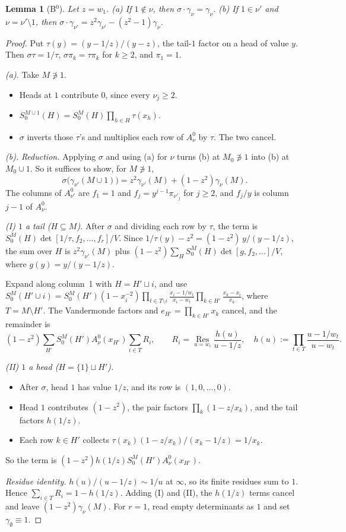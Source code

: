 \documentclass[11pt]{article}
\newtheorem{lemma}[theorem]{Lemma}
\theoremstyle{remark}
\begin{document}
\begin{lemma}[B$^0$]
Let $z=w_1$. (a) If $1\notin\nu$, then $\sigma\cdot\gamma_\nu=\gamma_\nu$.
(b) If $1\in\nu'$ and $\nu=\nu'\setminus1$, then $\sigma\cdot\gamma_{\nu'}=z^2\gamma_{\nu'}-(z^2-1)\gamma_\nu$.
\end{lemma}
\begin{proof}
Put $\tau(y)=(y-1/z)/(y-z)$, the tail-$1$ factor on a head of value $y$. Then $\sigma\tau=1/\tau$,
$\sigma\pi_k=\tau\pi_k$ for $k\ge2$, and $\pi_1=1$.

\emph{(a).} Take $M\not\ni1$.
\begin{itemize}[leftmargin=*,itemsep=1pt]
\item Heads at $1$ contribute $0$, since every $\nu_j\ge2$.
\item $S_0^{M\cup1}(H)=S_0^M(H)\prod_{h\in H}\tau(x_h)$.
\item $\sigma$ inverts those $\tau$'s and multiplies each row of $A^0_\nu$ by $\tau$. The two cancel.
\end{itemize}

\emph{(b).} \emph{Reduction.} Applying $\sigma$ and using (a) for $\nu$ turns (b) at $M_0\not\ni1$ into (b) at
$M_0\cup1$. So it suffices to show, for $M\not\ni1$,
\[
\sigma\big(\gamma_{\nu'}(M\cup1)\big)=z^2\gamma_{\nu'}(M)+(1-z^2)\gamma_\nu(M).
\]
The columns of $A^0_{\nu'}$ are $f_1=1$ and $f_j=y^{j-1}\pi_{\nu'_j}$ for $j\ge2$, and $f_j/y$ is column $j-1$ of $A^0_\nu$.

\emph{(I) $1$ a tail ($H\subseteq M$).} After $\sigma$ and dividing each row by $\tau$, the term is
$S_0^M(H)\det[1/\tau,f_2,\dots,f_r]/V$. Since $1/\tau(y)-z^2=(1-z^2)\,y/(y-1/z)$, the sum over $H$ is
$z^2\gamma_{\nu'}(M)$ plus $(1-z^2)\sum_HS_0^M(H)\det[g,f_2,\dots]/V$, where $g(y)=y/(y-1/z)$.

Expand along column~1 with $H=H'\sqcup i$, and use
$S_0^M(H'\cup i)=S_0^M(H')(1-x_i^{-2})\prod_{t\in T\setminus i}\frac{x_i-1/w_t}{x_i-w_t}\prod_{k\in H'}\frac{x_k-x_i}{x_k}$,
where $T=M\setminus H'$. The Vandermonde factors and $e_{H'}=\prod_{k\in H'}x_k$ cancel, and the remainder is
\[
(1-z^2)\sum_{H'}S_0^M(H')A^0_\nu(x_{H'})\sum_{i\in T}R_i,\qquad
R_i=\operatorname*{Res}_{u=w_i}\frac{h(u)}{u-1/z},\quad h(u):=\prod_{t\in T}\frac{u-1/w_t}{u-w_t}.
\]

\emph{(II) $1$ a head ($H=\{1\}\sqcup H'$).}
\begin{itemize}[leftmargin=*,itemsep=1pt]
\item After $\sigma$, head $1$ has value $1/z$, and its row is $(1,0,\dots,0)$.
\item Head $1$ contributes $(1-z^2)$, the pair factors $\prod_{k}(1-z/x_k)$, and the tail factors $h(1/z)$.
\item Each row $k\in H'$ collects $\tau(x_k)(1-z/x_k)/(x_k-1/z)=1/x_k$.
\end{itemize}
So the term is $(1-z^2)h(1/z)S_0^M(H')A^0_\nu(x_{H'})$.

\emph{Residue identity.} $h(u)/(u-1/z)\sim1/u$ at $\infty$, so its finite residues sum to $1$. Hence
$\sum_{i\in T}R_i=1-h(1/z)$. Adding (I) and (II), the $h(1/z)$ terms cancel and leave $(1-z^2)\gamma_\nu(M)$. For
$r=1$, read empty determinants as $1$ and set $\gamma_\emptyset\equiv1$.
\end{proof}
\end{document}
